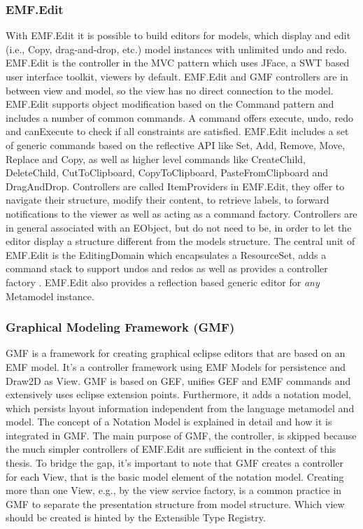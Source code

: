 \subsubsection{EMF.Edit}
With EMF.Edit it is possible to build editors for models, which display and edit (i.e., Copy, drag-and-drop, etc.) model instances with unlimited undo and redo. EMF.Edit is the controller in the MVC pattern which uses JFace, a SWT based user interface toolkit, viewers by default. EMF.Edit and GMF controllers are in between view and model, so the view has no direct connection to the model. EMF.Edit supports object modification based on the Command pattern \cite{patterns} and includes a number of common commands. A command offers execute, undo, redo and canExecute to check if all constraints are satisfied.  EMF.Edit includes a set of generic commands based on the reflective API like Set, Add, Remove, Move, Replace and Copy, as well as  higher level commands like CreateChild, DeleteChild, CutToClipboard, CopyToClipboard, PasteFromClipboard and DragAndDrop. Controllers are called ItemProviders in EMF.Edit, they offer to navigate their structure, modify their content, to retrieve labels, to forward notifications to the viewer as well as acting as a command factory. Controllers are in general associated with an EObject, but do not need to be, in order to let the editor display a structure different from the models structure. The central unit of EMF.Edit is the EditingDomain which encapsulates a ResourceSet, adds a command stack to support undos and redos as well as provides a controller factory \cite{EMF2nd}. EMF.Edit also provides a reflection based generic editor for \emph{any} Metamodel instance.  


\subsubsection {Graphical Modeling Framework (GMF)}
GMF is a framework for creating graphical eclipse editors that are based on an EMF model. It's a controller framework using EMF Models for persistence and Draw2D as View. GMF is based on GEF,  unifies GEF and EMF commands and extensively uses eclipse extension points. Furthermore, it adds a notation model, which persists layout information independent from the language metamodel and model. The concept of a Notation Model is explained in detail  and how it is integrated in GMF. The main purpose of GMF, the controller, is skipped because the much simpler controllers of EMF.Edit are sufficient in the context of this thesis. To bridge the gap, it's important to note that GMF creates a controller for each View, that is the basic model element of the notation model. Creating more than one View, e.g., by the view service factory, is a common practice in GMF to separate the presentation structure from model structure. Which view should be created is hinted by the Extensible Type Registry.

